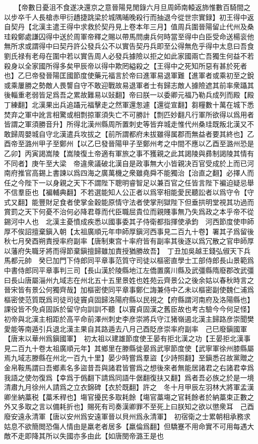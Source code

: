 　　【帝數日憂沮不食遂决還京之意晉陽見閒錄六月旦周師南轅返斾惟數百騎間之以步卒千人長槍赤甲衍趫捷跳梁於城隅晡晚殺行而抽退今從世宗實録】初王得中返自契丹【北漢主遣王得中求救於契丹見上卷本年三月】值周兵圍晉陽留止代州及桑珪殺鄭處謙囚得中送於周軍帝釋之賜以帶馬問虜兵何時當至得中白臣受命送楊衮他無所求或謂得中曰契丹許公發兵公不以實告契丹兵即至公得無危乎得中太息曰吾食劉氏禄有老母在圍中若以實告周人必發兵據險以拒之如此家國兩亡吾獨生何益不若殺身以全家國所得多矣甲辰帝以得中欺罔縊殺之【王得中之死知所惡有甚於死者也】乙巳帝發晉陽匡國節度使藥元福言於帝曰進軍易退軍難【進軍者或乘初至之銳或乘屢勝之勢敵人畏讋自守不敢迎戰故易退軍者士有歸志敵人據險遮其前率衆躡其後輜重老弱皆足爲吾之累故難易以䜴翻】帝曰朕一以委卿元福乃勒兵成列而殿【殿丁練翻】北漢果出兵追躡元福擊走之然軍還怱遽【還從宣翻】芻糧數十萬在城下悉焚弃之軍中訛言相驚或相剽掠軍須失亡不可勝計【剽匹妙翻凡行軍所欲得以爲用者皆謂之軍須勝音升】所得北漢州縣周所置刺史等皆弃城走惟代州桑珪既叛北漢又不敢歸周嬰城自守北漢遣兵攻拔之【前所謂都府未拔雖得属郡而無益者要其終也】乙酉帝至潞州甲子至鄭州【以乙巳發晉陽甲子至鄭州考之中間不應以乙酉至潞州恐是乙卯】丙寅謁嵩陵【嵩陵復土帝適有軍旅之事不獲親之此其謁陵與彞制謁陵其情有不同者】庚午至大梁　帝違衆議破北漢自是政事無大小皆親决百官受成於上而已河南府推官高錫上書諫以爲四海之廣萬機之衆雖堯舜不能獨治【治直之翻】必擇人而任之今陛下一以身親之天下不謂陛下聰明睿智足以兼百官之任皆言陛下褊迫疑忌舉不信羣臣也【褊輔典翻】不若選能知人公正者以爲宰相能愛民聽訟者以爲守令【守式又翻】能豐財足食者使掌金穀能原情守法者使掌刑獄陛下但垂拱明堂視其功過而賞罰之天下何憂不治何必降君尊而代臣職屈貴位而親賤事無乃失爲政之本乎帝不從錫河中人也　北漢主憂憤成疾悉以國事委其子侍衛都指揮使承鈞　河西節度使申師厚不俟詔擅棄鎭入朝【太祖廣順元年申師厚鎭河西事見二百九十卷】署其子爲留後秋七月癸酉朔責授率府副率【唐制東宫十率府皆有副率其後逐以爲冗散之官申師厚以藩府失職牙將而得節棄鎭擅歸雖加責授猶勝故吾】　丁丑加吳越王錢弘俶天下兵馬都元帥　癸巳加門下侍郎同平章事范質守司徒以樞密直學士工部侍郎長山景範爲中書侍郎同平章事判三司【長山漢於陵縣地江左僑置廣川縣及武彊縣隋廢郡改武彊曰長山唐屬淄州九域志在州北五十五里景姓也姓苑云齊景公之後余姑以春秋時言之晉宋皆有景公何獨齊哉】加樞密使同平章事鄭仁誨兼侍中乙未以樞密副使魏仁浦爲樞密使范質既爲司徒司徒竇貞固歸洛陽府縣以民視之【府縣謂河南府及洛陽縣也】課役皆不免貞固訴於留守向訓訓不聽【以竇貞固漢之舊臣故也考古驗今今何足怪】初帝與北漢主相距於高平命前澤州刺史李彦崇將兵守江猪嶺遏北漢主歸路彦崇聞樊愛能等南遁引兵退北漢主果自其路遁去八月己酉貶彦崇率府副率　己巳廢鎭國軍【唐末以華州爲鎭國軍】　初太祖以建雄節度使王晏有拒北漢之功【王晏拒北漢事見二百九十卷太祖廣順元年】其鄉里在滕縣徙晏爲武寧節度使【武寧軍徐州膝縣屬焉九域志滕縣在州北一百九十里】晏少時嘗爲羣盜【少詩照翻】至鎭悉召故黨贈之金帛鞍馬謂曰吾鄉素名多盜昔吾與諸君皆嘗爲之想後來者無能居諸君之右諸君幸爲我語之使勿復爲【幸爲于僞翻下請爲同語牛倨翻復扶又翻】爲者吾必族之於是一境清肅九月徐州人請爲之立衣錦碑【衣於既翻】許之　冬十月甲辰左羽林大將軍孟漢卿坐納藁税【藁禾稈也】塲官擾民多取耗餘【塲官藁塲之官耗餘者於納藁束正數之外又多取之言以備耗折也】賜死有司奏漢卿罪不至死上曰朕知之欲以懲衆耳　己酉廢安遠永清軍【唐以安州爲安遠軍晉以貝州爲永清軍】　初宿衛之士累朝相承務求姑息不欲簡閲恐傷人情由是羸老者居多【羸倫爲翻】但驕蹇不用命實不可用每遇大敵不走即降其所以失國亦多由此【如唐閔帝潞王是也